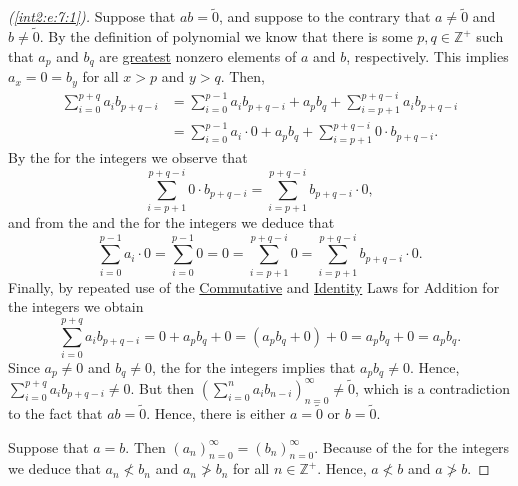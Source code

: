 \begin{proof}[(\ref{int2:e:7:1})]
	Suppose that $a b = \widetilde{0}$, and suppose to the contrary that $a \not= \widetilde{0}$ and $b \not= \widetilde{0}$. By the definition of polynomial we know that there is some $p, q \in \mathbb{Z}^{+}$ such that $a_p$ and $b_q$ are \hyperref[int2:e:7:d:greatest_element]{greatest} nonzero elements of $a$ and $b$, respectively. This implies $a_x = 0 = b_y$ for all $x > p$ and $y > q$. Then,
	\begin{align*}
		\sum_{i=0}^{p+q} a_i b_{p+q-i} & = \sum_{i=0}^{p-1} a_i b_{p+q-i} + a_p b_q + \sum_{i=p+1}^{p+q-i} a_i b_{p+q-i}    \\
		                               & = \sum_{i=0}^{p-1} a_i \cdot 0 + a_p b_q + \sum_{i=p+1}^{p+q-i} 0 \cdot b_{p+q-i}.
	\end{align*}
	By the  for the integers we observe that
	\[
		\sum_{i=p+1}^{p+q-i} 0 \cdot b_{p+q-i} = \sum_{i=p+1}^{p+q-i} b_{p+q-i} \cdot 0,
	\]
	and from the  and the  for the integers we deduce that
	\[
		\sum_{i=0}^{p-1} a_i \cdot 0 = \sum_{i=0}^{p-1} 0 = 0 = \sum_{i=p+1}^{p+q-i} 0 = \sum_{i=p+1}^{p+q-i} b_{p+q-i} \cdot 0.
	\]
	Finally, by repeated use of the \hyperref[int2:d:oid:commutative_add]{Commutative} and \hyperref[int2:d:oid:identity_add]{Identity} Laws for Addition for the integers we obtain
	\[
		\sum_{i=0}^{p+q} a_i b_{p+q-i} = 0 + a_p b_q + 0 = (a_p b_q + 0) + 0 = a_p b_q + 0 = a_p b_q.
	\]
	Since $a_p \not= 0$ and $b_q \not= 0$, the  for the integers implies that $a_p b_q \not= 0$. Hence, $\sum_{i=0}^{p+q} a_i b_{p+q-i} \not= 0$. But then $\left( \sum_{i=0}^n a_i b_{n-i} \right)_{n=0}^\infty \not= \widetilde{0}$, which is a contradiction to the fact that $a b = \widetilde{0}$. Hence, there is either $a = \widetilde{0}$ or $b = \widetilde{0}$.

	Suppose that $a = b$. Then $(a_n)_{n=0}^\infty = (b_n)_{n=0}^\infty$. Because of the  for the integers we deduce that $a_n \not< b_n$ and $a_n \not> b_n$ for all $n \in \mathbb{Z}^{+}$. Hence, $a \not< b$ and $a \not> b$.


\end{proof}
